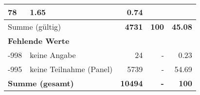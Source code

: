 \begin{longtable}{lXrrr}
       \num{78} &
       \num[round-mode=places,round-precision=2]{1.65} &
         \num[round-mode=places,round-precision=2]{0.74} \\
     \midrule
     \multicolumn{2}{l}{Summe (gültig)} &
       \textbf{\num{4731}} &
     \textbf{\num{100}} &
       \textbf{\num[round-mode=places,round-precision=2]{45.08}} \\
     \multicolumn{5}{l}{\textbf{Fehlende Werte}}\\
       -998 &
       keine Angabe &
         \num{24} &
        - &
         \num[round-mode=places,round-precision=2]{0.23} \\
       -995 &
       keine Teilnahme (Panel) &
         \num{5739} &
        - &
         \num[round-mode=places,round-precision=2]{54.69} \\
     \midrule
     \multicolumn{2}{l}{\textbf{Summe (gesamt)}} &
          \textbf{\num{10494}} &
        \textbf{-} &
        \textbf{\num{100}} \\
     \bottomrule
     \end{longtable}
     
